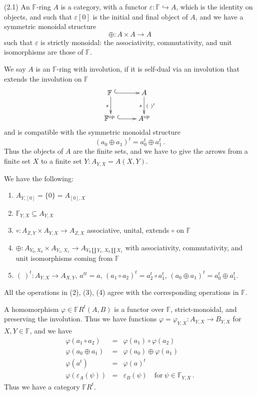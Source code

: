 \documentclass[leqno]{article}
\numberwithin{equation}{section}
\begin{document}
\bigskip

\noindent (2.1)  An ${\mathbb F}$-ring $A$ is a category, with a functor $\varepsilon : {\mathbb F} \hookrightarrow A$, which is the identity on objects, and such that $\varepsilon [0]$ is the initial and final object of $A$, and we have a symmetric monoidal structure
$$
\oplus : A \times A \to A
$$
such that $\varepsilon$ is strictly monoidal: the associativity, commutativity, and unit isomorphisms are those of ${\mathbb F}$. 

\bigskip

We say $A$ is an ${\mathbb F}$-ring with involution, if it is self-dual via an involution that extends the involution on ${\mathbb F}$
$$
\xymatrix{
{\mathbb F} \ \ar@{^{(}->}[r] \ar[d]_{s} &A \ar[d]_{s}^{( \ )^t} \\
{\mathbb F}^{\rm op} \ \ar@{^{(}->}[r] &A^{\rm op}
}
$$
and is compatible with the symmetric monoidal structure
$$
(a_0 \oplus a_1)^t = a_0^t \oplus a_1^t \, .
$$
Thus the objects of $A$ are the finite sets, and we have to give the arrows from a finite set $X$ to a finite set $Y : A_{Y,X} = A(X,Y)$.

\smallskip

We have the following:
\begin{enumerate}
\item[(0)] $A_{Y , [0]} = \{0\} = A_{[0],X}$
\item[(1)] ${\mathbb F}_{Y,X} \subseteq A_{Y,X}$
\item[(2)] $\circ : A_{Z,Y} \times A_{Y,X} \to A_{Z,X}$ associative, unital, extends $\circ$ on ${\mathbb F}$
\item[(3)] $\oplus : A_{Y_0 , X_0} \times A_{Y_1 , X_1} \to A_{Y_0 \amalg Y_1 , X_0 \amalg X_1}$ with associativity, commutativity, and unit isomorphisms coming from ${\mathbb F}$
\item[(4)] $( \ )^t : A_{Y,X} \to A_{X,Y}$, $a^{tt} = a$, $(a_1 \circ a_2)^t = a_2^t \circ a_1^t$, $(a_0 \oplus a_1)^t = a_0^t \oplus a_1^t$.
\end{enumerate}

All the operations in (2), (3), (4) agree with the corresponding operations in ${\mathbb F}$. 

\smallskip

A homomorphism $\varphi \in {\mathbb F} R^t (A,B)$ is a functor over ${\mathbb F}$, strict-monoidal, and preserving the involution. Thus we have functions $\varphi = \varphi_{Y,X} : A_{Y,X} \to B_{Y,X}$ for $X,Y \in {\mathbb F}$, and we have
\begin{eqnarray}
\varphi (a_1 \circ a_2) &= &\varphi (a_1) \circ \varphi (a_2) \nonumber \\
\varphi (a_0 \oplus a_1) &= &\varphi (a_0) \oplus \varphi (a_1) \nonumber \\
\varphi (a^t) &= &\varphi (a)^t \nonumber \\
\varphi (\varepsilon_A (\psi)) &= &\varepsilon_B (\psi) \quad \mbox{for} \ \psi \in {\mathbb F}_{Y,X} \, . \nonumber 
\end{eqnarray}
Thus we have a category ${\mathbb F} R^t$.
\end{document}
